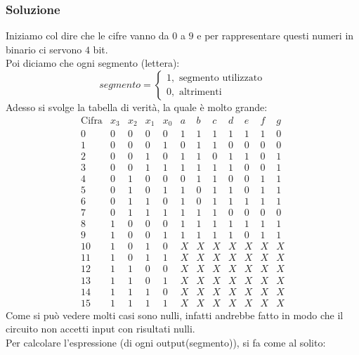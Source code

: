 \documentclass[12pt,a4paper]{article}
\begin{document}
\subsubsection{Soluzione}
Iniziamo col dire che le cifre vanno da $0$ a $9$ e per rappresentare questi numeri in binario ci servono $4$ bit.\\
Poi diciamo che ogni segmento (lettera):
\[
segmento = \begin{cases}
    1, \text{ segmento utilizzato}\\
    0, \text{ altrimenti}
\end{cases}
\]
Adesso si svolge la tabella di verità, la quale è molto grande:
\[
\begin{array}{c|cccc|ccccccc}
\text{Cifra} & x_3 & x_2 & x_1 & x_0 & a & b & c & d & e & f & g \\
\hline
0  & 0 & 0 & 0 & 0 & 1 & 1 & 1 & 1 & 1 & 1 & 0 \\
1  & 0 & 0 & 0 & 1 & 0 & 1 & 1 & 0 & 0 & 0 & 0 \\
2  & 0 & 0 & 1 & 0 & 1 & 1 & 0 & 1 & 1 & 0 & 1 \\
3  & 0 & 0 & 1 & 1 & 1 & 1 & 1 & 1 & 0 & 0 & 1 \\
4  & 0 & 1 & 0 & 0 & 0 & 1 & 1 & 0 & 0 & 1 & 1 \\
5  & 0 & 1 & 0 & 1 & 1 & 0 & 1 & 1 & 0 & 1 & 1 \\
6  & 0 & 1 & 1 & 0 & 1 & 0 & 1 & 1 & 1 & 1 & 1 \\
7  & 0 & 1 & 1 & 1 & 1 & 1 & 1 & 0 & 0 & 0 & 0 \\
8  & 1 & 0 & 0 & 0 & 1 & 1 & 1 & 1 & 1 & 1 & 1 \\
9  & 1 & 0 & 0 & 1 & 1 & 1 & 1 & 1 & 0 & 1 & 1 \\
10 & 1 & 0 & 1 & 0 & X & X & X & X & X & X & X \\
11 & 1 & 0 & 1 & 1 & X & X & X & X & X & X & X \\
12 & 1 & 1 & 0 & 0 & X & X & X & X & X & X & X \\
13 & 1 & 1 & 0 & 1 & X & X & X & X & X & X & X \\
14 & 1 & 1 & 1 & 0 & X & X & X & X & X & X & X \\
15 & 1 & 1 & 1 & 1 & X & X & X & X & X & X & X
\end{array}
\]
Come si può vedere molti casi sono nulli, infatti andrebbe fatto in modo che il circuito non accetti input con risultati nulli.\\
Per calcolare l'espressione (di ogni output(segmento)), si fa come al solito:
\end{document}
